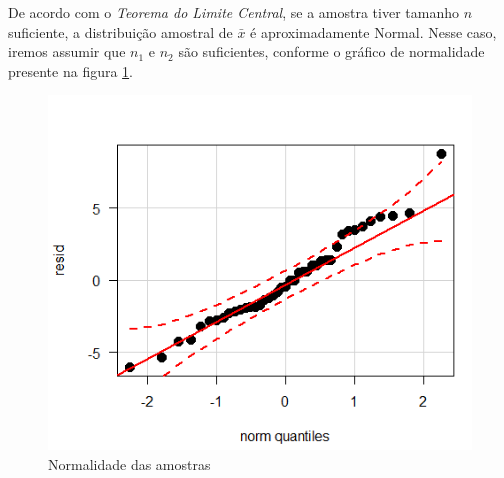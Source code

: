 \documentclass[12pt, a4paper]{article}
\begin{document}
\par De acordo com o \textit{Teorema do Limite Central}, se a amostra tiver tamanho $n$ suficiente, a distribuição amostral de $\bar{x}$ é aproximadamente Normal. Nesse caso, iremos assumir que $n_{1}$ e $n_{2}$ são suficientes, conforme o gráfico de normalidade presente na figura \ref{fig:normal}.
\begin{figure}[h]
\centering
\includegraphics[scale=0.8]{img/plot-normalidade.png}
\caption{Normalidade das amostras}
\label{fig:normal}
\end{figure}
\end{document}
